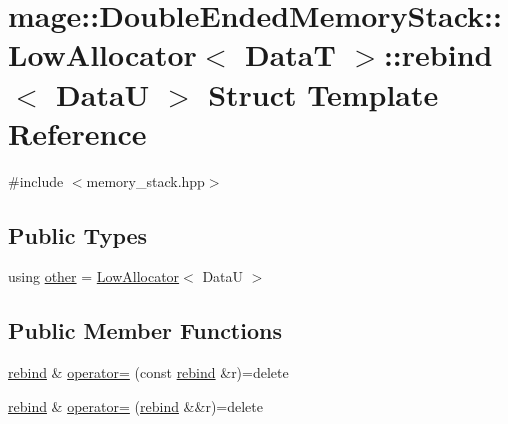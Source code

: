 \hypertarget{structmage_1_1_double_ended_memory_stack_1_1_low_allocator_1_1rebind}{}\section{mage\+:\+:Double\+Ended\+Memory\+Stack\+:\+:Low\+Allocator$<$ DataT $>$\+:\+:rebind$<$ DataU $>$ Struct Template Reference}
\label{structmage_1_1_double_ended_memory_stack_1_1_low_allocator_1_1rebind}


{\ttfamily \#include $<$memory\+\_\+stack.\+hpp$>$}

\subsection*{Public Types}
\begin{DoxyCompactItemize}
\item 
using \hyperlink{structmage_1_1_double_ended_memory_stack_1_1_low_allocator_1_1rebind_ad2d30609df172b2f8759819439a41bfd}{other} = \hyperlink{structmage_1_1_double_ended_memory_stack_1_1_low_allocator}{Low\+Allocator}$<$ DataU $>$
\end{DoxyCompactItemize}
\subsection*{Public Member Functions}
\begin{DoxyCompactItemize}
\item 
\hyperlink{structmage_1_1_double_ended_memory_stack_1_1_low_allocator_1_1rebind}{rebind} \& \hyperlink{structmage_1_1_double_ended_memory_stack_1_1_low_allocator_1_1rebind_a6523f389470eb39aac4d876d8bc22469}{operator=} (const \hyperlink{structmage_1_1_double_ended_memory_stack_1_1_low_allocator_1_1rebind}{rebind} \&r)=delete
\item 
\hyperlink{structmage_1_1_double_ended_memory_stack_1_1_low_allocator_1_1rebind}{rebind} \& \hyperlink{structmage_1_1_double_ended_memory_stack_1_1_low_allocator_1_1rebind_ad09f9f5cfec3b8d6883d4563d180c8a1}{operator=} (\hyperlink{structmage_1_1_double_ended_memory_stack_1_1_low_allocator_1_1rebind}{rebind} \&\&r)=delete
\end{DoxyCompactItemize}
